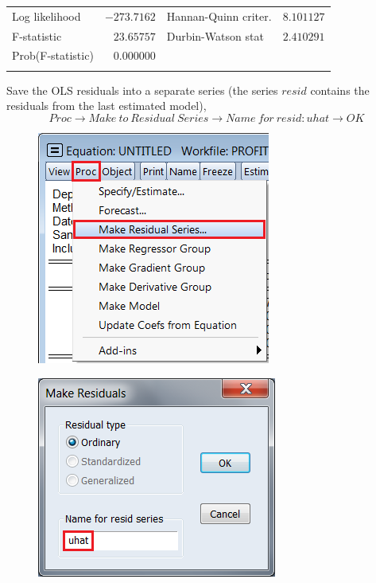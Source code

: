 \documentclass[12pt]{report}
\begin{document}
\begin{table}[!htbp]
\begin{tabular}{lrrrr}
		\multicolumn{1}{l}{Log likelihood}&\multicolumn{1}{r}{$-273.7162$}&\multicolumn{2}{l}{Hannan-Quinn criter.}&\multicolumn{1}{r}{$8.101127$}\\
		\multicolumn{1}{l}{F-statistic}&\multicolumn{1}{r}{$23.65757$}&\multicolumn{2}{l}{Durbin-Watson stat}&\multicolumn{1}{r}{$2.410291$}\\
		\multicolumn{1}{l}{Prob(F-statistic)}&\multicolumn{1}{r}{$0.000000$}&\multicolumn{1}{c}{}&\multicolumn{1}{c}{}&\multicolumn{1}{c}{}\\
		[4.5pt] \hline \\ [-4.5pt]
	\end{tabular}
\end{table}


\noindent Save the OLS residuals into a separate series (the series $resid$ contains the residuals from the last estimated model),
$$Proc \to Make\ to\ Residual\ Series \to Name\ for\ resid:uhat \to OK$$
\begin{figure}[H]
	\centering
	\includegraphics{q1_2}
\end{figure}
\vspace{-\baselineskip}
\begin{figure}[H]
	\centering
	\includegraphics{q1_3}
\end{figure}
\end{document}
